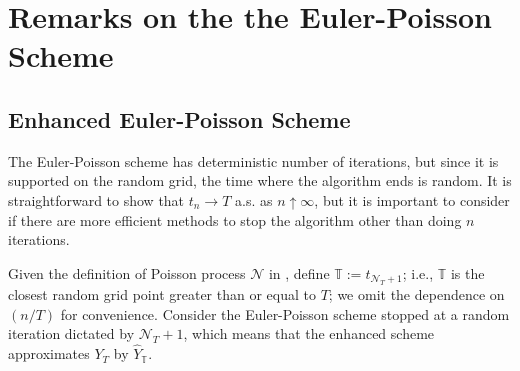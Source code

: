 \chapter{Remarks on the the Euler-Poisson Scheme}\label{Enhaced_EP}
\section{Enhanced Euler-Poisson Scheme}\label{Enhaced_EP}
The Euler-Poisson scheme has deterministic number of iterations, but since it is supported on the random grid, the time where the algorithm ends is random. It is straightforward to show that $t_n \to T$ a.s. as $n \uparrow \infty$, but it is important to consider if there are more efficient methods to stop the  algorithm other than doing $n$ iterations.

Given the definition of Poisson process $\mathcal{N}$ in , define $\mathbb{T} := t_{\mathcal{N}_T+1}$; i.e., $\mathbb{T}$ is the closest random grid point greater than or equal to $T$; we omit the dependence on $(n/T)$ for convenience. Consider the Euler-Poisson scheme stopped at a random iteration dictated by $\mathcal{N}_{T}+1$, which means that the enhanced scheme approximates $Y_T$ by $\hat{Y}_\mathbb{T}$.

